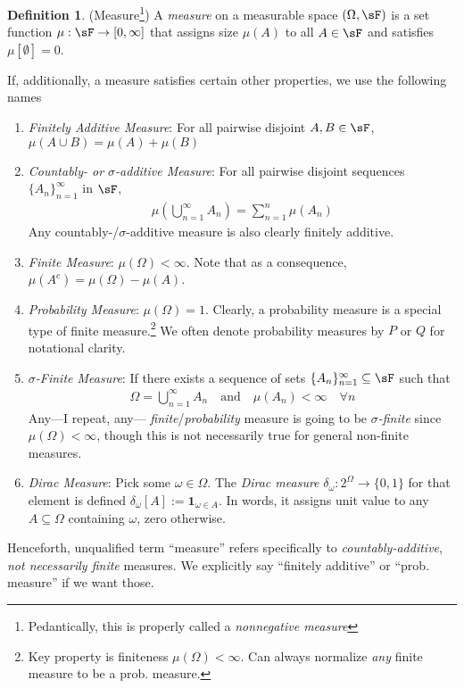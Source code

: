 \documentclass[12pt]{article}
\theoremstyle{plain}
\theoremstyle{definition}
\newtheorem{defn}[thm]{Definition}
\theoremstyle{remark}
\newcommand{\ra}{\rightarrow}
\newcommand{\one}[1]{\mathbf{1}_{#1}}
\newcommand{\ninf}{_{n=1}^\infty}
\begin{document}
\begin{defn}(Measure\footnote{%
  Pedantically, this is properly called a \emph{nonnegative measure}
})
\label{defn:measure}
A \emph{measure}
on a measurable space $(\Omega,\sF)$ is a set function
$\mu: \sF \rightarrow [0,\infty]$
that assigns size $\mu(A)$ to all $A\in\sF$ and satisfies
$\mu[\emptyset]=0$.

If, additionally, a measure satisfies certain other properties, we use
the following names
\begin{enumerate}
  \item \emph{Finitely Additive Measure}:
    For all pairwise disjoint $A,B\in\sF$,
    $\mu(A\cup B)=\mu(A) + \mu(B)$
  \item \emph{Countably- or $\sigma$-additive Measure}:
    For all pairwise disjoint sequences $\{A_n\}_{n=1}^\infty$ in $\sF$,
    \begin{align*}
      \mu\left(\bigcup^\infty_{n=1}A_n\right)
      = \sum^n_{n=1} \mu(A_n)
    \end{align*}
    Any countably-/$\sigma$-additive measure is also clearly
    finitely additive.

  \item \emph{Finite Measure}:
    $\mu(\Omega)<\infty$. Note that as a consequence,
    $\mu(A^c) = \mu(\Omega) - \mu(A)$.

  \item \emph{Probability Measure}:
    $\mu(\Omega)=1$. Clearly, a probability measure is a special type
    of finite measure.\footnote{%
      Key property is finiteness $\mu(\Omega)<\infty$.
      Can always normalize \emph{any} finite measure to be a prob.
      measure.
    }
    We often denote probability measures by $P$ or
    $Q$ for notational clarity.


  \item \emph{$\sigma$-Finite Measure}:
    If there exists a sequence of sets $\{A_n\}\ninf\subseteq \sF$ such
    that
    \begin{align*}
      \Omega = \bigcup\ninf A_n
      \quad \text{and}\quad
      \mu(A_n)<\infty
      \quad\forall n
    \end{align*}
    Any---I repeat, any--- \emph{finite}/\emph{probability} measure is
    going to be \emph{$\sigma$-finite} since $\mu(\Omega)<\infty$,
    though this is not necessarily true for general non-finite measures.
  \item
    \emph{Dirac Measure}:
    Pick some $\omega\in\Omega$.
    The \emph{Dirac measure} $\delta_\omega:2^\Omega\ra \{0,1\}$ for
    that element is defined $\delta_\omega[A] := \one{\omega\in A}$.
    In words, it assigns unit value to any $A\subseteq\Omega$ containing
    $\omega$, zero otherwise.
\end{enumerate}
Henceforth, unqualified term ``measure'' refers specifically
to \emph{countably-additive}, \emph{not necessarily finite} measures.
We explicitly say ``finitely additive'' or ``prob. measure'' if we want
those.
\end{defn}
\end{document}
